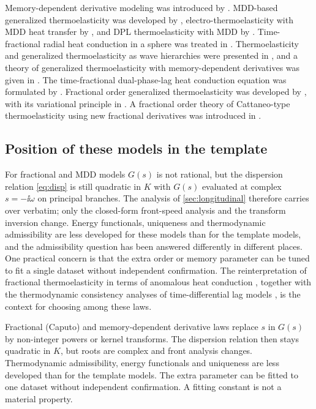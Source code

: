 Memory-dependent derivative modeling was introduced by \citep{Wang2011}. MDD-based generalized thermoelasticity was developed by \citep{Ezzat2016}, electro-thermoelasticity with MDD heat transfer by \citep{Ezzat2016a}, and DPL thermoelasticity with MDD by \citep{Ezzat2016b}. Time-fractional radial heat conduction in a sphere was treated in \citep{Povstenko2011}. Thermoelasticity and generalized thermoelasticity as wave hierarchies were presented in \citep{Scott2007}, and a theory of generalized thermoelasticity with memory-dependent derivatives was given in \citep{Shaw2019}. The time-fractional dual-phase-lag heat conduction equation was formulated by \citep{Xu2015}. Fractional order generalized thermoelasticity was developed by \citep{Youssef2010}, with its variational principle in \citep{Youssef2010a}. A fractional order theory of Cattaneo-type thermoelasticity using new fractional derivatives was introduced in \citep{Yu2020}.

\subsection{Position of these models in the template}
For fractional and MDD models $G(s)$ is not rational, but the dispersion relation \eqref{eq:disp} is still quadratic in $K$ with $G(s)$ evaluated at complex $s=-\ii\omega$ on principal branches. The analysis of \cref{sec:longitudinal} therefore carries over verbatim; only the closed-form front-speed analysis and the transform inversion change. Energy functionals, uniqueness and thermodynamic admissibility are less developed for these models than for the template models, and the admissibility question has been answered differently in different places. One practical concern is that the extra order or memory parameter can be tuned to fit a single dataset without independent confirmation. The reinterpretation of fractional thermoelasticity in terms of anomalous heat conduction \citep{Yu2024}, together with the thermodynamic consistency analyses of time-differential lag models \citep{Chirita2016,Tibullo2017}, is the context for choosing among these laws.

\begin{summarybox}[Summary]
Fractional (Caputo) and memory-dependent derivative laws replace $s$ in $G(s)$ by non-integer powers or kernel transforms. The dispersion relation then stays quadratic in $K$, but roots are complex and front analysis changes. Thermodynamic admissibility, energy functionals and uniqueness are less developed than for the template models. The extra parameter can be fitted to one dataset without independent confirmation. A fitting constant is not a material property.
\end{summarybox}
